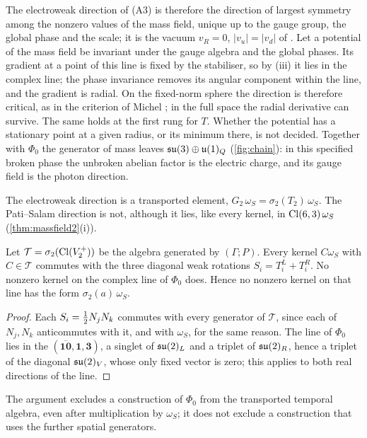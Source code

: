 The electroweak direction of (A3) is therefore the direction of largest symmetry among the nonzero values of the mass field, unique up to the
gauge group, the global phase and the scale; it is the vacuum $v_R=0$, $|v_u|=|v_d|$ of . Let a potential of the mass field be
invariant under the gauge algebra and the global phases. Its gradient at a point of this line is fixed by the stabiliser, so by (iii) it
lies in the complex line; the phase invariance removes its angular component within the line, and the gradient is radial. On the
fixed-norm sphere the direction is therefore critical, as in the criterion of Michel \cite{Michel71}; in the full space the radial
derivative can survive. The same holds at the first rung for $T$. Whether the potential has a stationary point at a given radius, or its
minimum there, is not decided. Together with $\Phi_0$ the generator of mass leaves $\mathfrak{su}(3)\oplus\mathfrak{u}(1)_Q$ (\cref{fig:chain}): in this specified
broken phase the unbroken abelian factor is the electric charge, and its gauge field is the photon direction.

The electroweak direction is a transported element, $G_2\,\omega_S=\sigma_2(T_2)\,\omega_S$. The Pati--Salam direction is not, although it
lies, like every kernel, in $\mathrm{Cl}(6,3)\,\omega_S$ (\cref{thm:massfield2}(i)).

\begin{proposition}
\label{prop:notransport}
Let $\mathcal T=\sigma_2(\mathrm{Cl}(V^+_2))$ be the algebra generated by $(\Gamma;P)$. Every kernel $C\omega_S$ with $C\in\mathcal T$ commutes with
the three diagonal weak rotations $S_i=T_i^L+T_i^R$. No nonzero kernel on the complex line of $\Phi_0$ does. Hence no nonzero kernel on that
line has the form $\sigma_2(a)\,\omega_S$.
\end{proposition}

\begin{proof}
Each $S_i=\tfrac12 N_jN_k$ commutes with every generator of $\mathcal T$, since each of $N_j,N_k$ anticommutes with it, and with $\omega_S$, for
the same reason. The line of $\Phi_0$ lies in the $(\overline{\mathbf{10}},\mathbf1,\mathbf3)$, a singlet of $\mathfrak{su}(2)_L$ and a triplet of
$\mathfrak{su}(2)_R$, hence a triplet of the diagonal $\mathfrak{su}(2)_V$, whose only fixed vector is zero; this applies to both real directions of the line.
\end{proof}

The argument excludes a construction of $\Phi_0$ from the transported temporal algebra, even after multiplication by $\omega_S$; it does not
exclude a construction that uses the further spatial generators.

